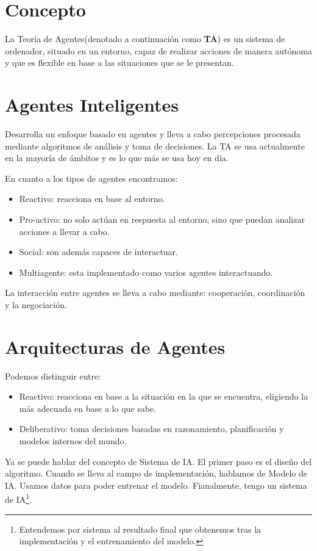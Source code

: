 \section{Concepto}
La Teoría de Agentes(denotado a continuación como \textbf{TA}) es un sistema de ordenador, situado en un entorno, capaz de realizar acciones de manera autónoma y que es flexible en base a las situaciones que se le presentan.

\section{Agentes Inteligentes}

Desarrolla un enfoque basado en agentes y lleva a cabo percepciones procesada mediante algoritmos de análisis y toma de decisiones. 
La TA se usa actualmente en la mayoría de ámbitos y es lo que más se usa hoy en día.

En cuanto a los tipos de agentes encontramos:

\begin{itemize}
    \item Reactivo: reacciona en base al entorno.
    \item Pro-activo: no solo actúan en respuesta al entorno, sino que puedan analizar acciones a llevar a cabo.
    \item  Social: son además capaces de interactuar.
    \item Multiagente: esta implementado como varios agentes interactuando.
\end{itemize}

La interacción entre agentes se lleva a cabo mediante: cooperación, coordinación y la negociación.


\section{Arquitecturas de Agentes}

Podemos distinguir entre:

\begin{itemize}
    \item Reactivo: reacciona en base a la situación en la que se encuentra, eligiendo la más adecuada en base a lo que sabe.
    \item Deliberativo: toma decisiones basadas en razonamiento, planificación y modelos internos del mundo.
\end{itemize}

Ya se puede hablar del concepto de Sistema de IA. El primer paso es el diseño del algoritmo. Cuando se lleva al campo de implementación, hablamos de Modelo de IA. Usamos datos para poder entrenar el modelo. Fianalmente, tengo un sistema de IA\footnote{Entendemos por sistema al resultado final que obtenemos tras la implementación y el entrenamiento del modelo.}.

